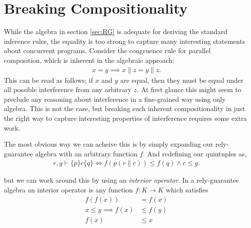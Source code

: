 \documentclass{llncs}
\begin{document}

\section{Breaking Compositionality}
\label{sec:INT}

While the algebra in section \ref{sec:RG} is adequate for deriving the
standard inference rules, the equality is too strong to capture many
interesting statements about concurrent programs. Consider the
congruence rule for parallel composition, which is inherent in the
algebraic approach:
\begin{align*}
x = y \implies x\|z = y\|z.
\end{align*}
This can be read as follows; if $x$ and $y$ are equal, then they must
be equal under all possible interference from any arbitrary $z$. At
first glance this might seem to preclude any reasoning about
interference in a fine-grained way using only algebra. This is not the
case, but breaking such inherent compositionality in just the right way to
capture interesting properties of interference requires some extra work.

The most obvious way we can acheive this is by simply expanding our
rely-guarantee algebra with an arbitrary function $f$. And redefining our quintuples
as,
\begin{align*}
r, g \vdash \{p\} c \{q\} \iff f(p(r\|c)) \le f(q) \land c \le g.
\end{align*}


 but we can work around this by
using an \emph{interior operator}. In a rely-guarantee algebra an
interior operator is any function $f : K \to K$ which satisfies
\begin{align*}
f(f(x)) &= f(x) \tag{$f$ is idempotent}\\
x \le y \implies f(x) &\le f(y) \tag{$f$ is isotone}\\
f(x) &\le x \tag{$f$ is coextensive}
\end{align*}
\end{document}
